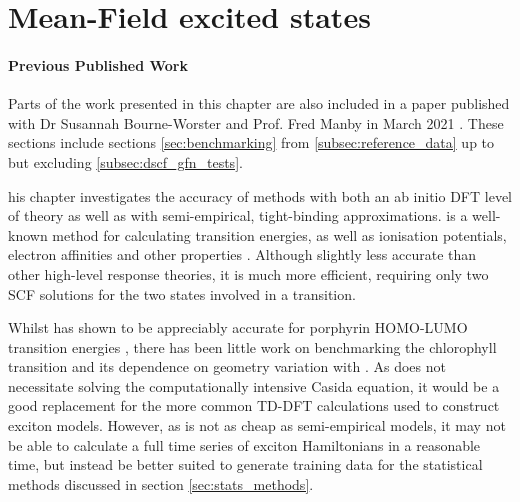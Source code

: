 %
%
\chapter{Mean-Field excited states}
\label{chap:dscf}

\subsubsection*{Previous Published Work}
Parts of the work presented in this chapter are also included in a paper published 
with Dr Susannah Bourne-Worster and Prof. Fred Manby in March 2021 \cite{Worster2021}. 
These sections include sections \ref{sec:benchmarking} from \ref{subsec:reference_data}
up to but excluding \ref{subsec:dscf_gfn_tests}.

his chapter investigates the accuracy of \dscf methods with both an 
ab initio DFT level of theory as well as with semi-empirical, tight-binding approximations.
\dscf is a well-known method for calculating transition energies, as well as ionisation
potentials, electron affinities and other properties \cite{Hunt1969, Kowalczyk2011, Terranova2013, Lutsker2015}. Although slightly
less accurate than other high-level response theories, it is much more efficient,
requiring only two SCF solutions for the two states involved in a transition. 

Whilst \dscf has shown to be appreciably accurate for porphyrin HOMO-LUMO transition
energies \cite{Kowalczyk2011}, there has been little work on benchmarking the chlorophyll
\Qy transition and its dependence on geometry variation with \dscf. As \dscf does
not necessitate solving the computationally intensive Casida equation, it would be
a good replacement for the more common TD-DFT calculations used to construct exciton
models. However, as \dscf is not as cheap as semi-empirical models, it may not be
able to calculate a full time series of exciton Hamiltonians in a reasonable time,
but instead be better suited to generate training data for the statistical methods
discussed in section \ref{sec:stats_methods}.

